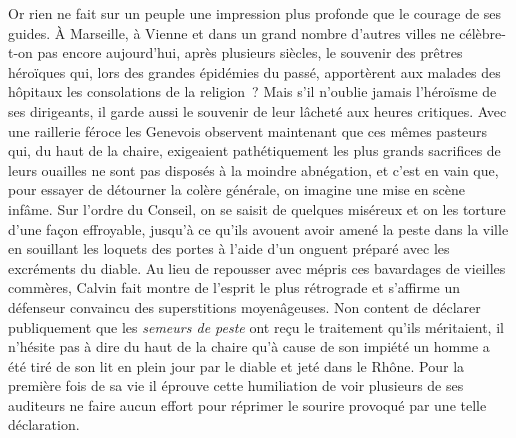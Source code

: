 \documentclass[french,twoside]{book} %
\begin{document}
Or rien ne fait sur un peuple une impression plus profonde que le courage de ses guides. À Marseille, à Vienne et dans un grand nombre d’autres villes ne célèbre-t-on pas encore aujourd’hui, après plusieurs siècles, le souvenir des prêtres héroïques qui, lors des grandes épidémies du passé, apportèrent aux malades des hôpitaux les consolations de la religion ? Mais s’il n’oublie jamais l’héroïsme de ses dirigeants, il garde aussi le souvenir de leur lâcheté aux heures critiques. Avec une raillerie féroce les Genevois observent maintenant que ces mêmes pasteurs qui, du haut de la chaire, exigeaient pathétiquement les plus grands sacrifices de leurs ouailles ne sont pas disposés à la moindre abnégation, et c’est en vain que, pour essayer de détourner la colère générale, on imagine une mise en scène infâme. Sur l’ordre du Conseil, on se saisit de quelques miséreux et on les torture d’une façon effroyable, jusqu’à ce qu’ils avouent avoir amené la peste dans la ville en souillant les loquets des portes à l’aide d’un onguent préparé avec les excréments du diable. Au lieu de repousser avec mépris ces bavardages de vieilles commères, Calvin fait montre de l’esprit le plus rétrograde et s’affirme un défenseur convaincu des superstitions moyenâgeuses. Non content de déclarer publiquement que les \emph{semeurs de peste} ont reçu le traitement qu’ils méritaient, il n’hésite pas à dire du haut de la chaire qu’à cause de son impiété un homme a été tiré de son lit en plein jour par le diable et jeté dans le Rhône. Pour la première fois de sa vie il éprouve cette humiliation de voir plusieurs de ses auditeurs ne faire aucun effort pour réprimer le sourire provoqué par une telle déclaration.\par
\end{document}
